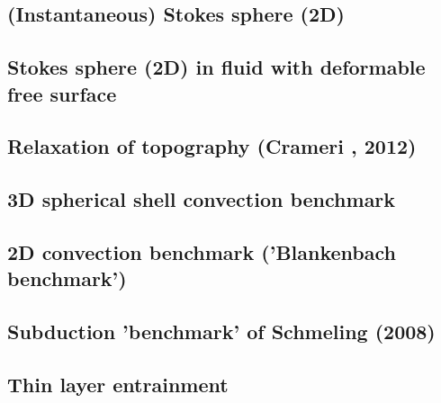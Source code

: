 \newpage
\subsection{(Instantaneous) Stokes sphere (2D)} \label{ss:stokes_sphere2D}


\newpage
\subsection{Stokes sphere (2D) in fluid with deformable free surface} \label{ss:stokes_sphere_fs2D}


\subsection{Relaxation of topography (Crameri \etal, 2012)} \label{ss:crsg12}


\subsection{3D spherical shell convection benchmark} \label{ss:sscb3D}


\subsection{2D convection benchmark ('Blankenbach \etal benchmark')} \label{ss:blbc89}


\subsection{Subduction 'benchmark' of Schmeling \etal (2008)}


\subsection{Thin layer entrainment} \label{sec:tlentr}


